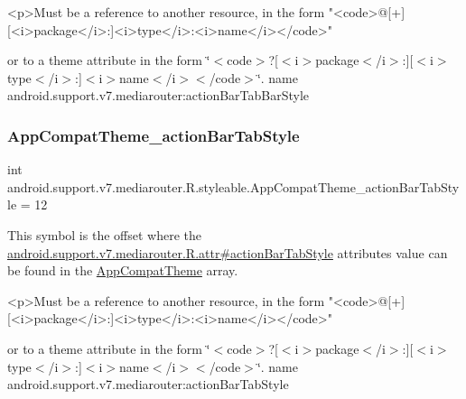 \begin{DoxyVerb}      <p>Must be a reference to another resource, in the form "<code>@[+][<i>package</i>:]<i>type</i>:<i>name</i></code>"
\end{DoxyVerb}
 or to a theme attribute in the form \char`\"{}$<$code$>$?\mbox{[}$<$i$>$package$<$/i$>$\+:\mbox{]}\mbox{[}$<$i$>$type$<$/i$>$\+:\mbox{]}$<$i$>$name$<$/i$>$$<$/code$>$\char`\"{}.  name android.\+support.\+v7.\+mediarouter\+:action\+Bar\+Tab\+Bar\+Style \mbox{\label{classandroid_1_1support_1_1v7_1_1mediarouter_1_1R_1_1styleable_a05c688cad9d1778c9c006d3567c37651}} 
\subsubsection{\texorpdfstring{App\+Compat\+Theme\+\_\+action\+Bar\+Tab\+Style}{AppCompatTheme\_actionBarTabStyle}}
{\footnotesize\ttfamily int android.\+support.\+v7.\+mediarouter.\+R.\+styleable.\+App\+Compat\+Theme\+\_\+action\+Bar\+Tab\+Style = 12\hspace{0.3cm}{\ttfamily [static]}}

This symbol is the offset where the \hyperlink{classandroid_1_1support_1_1v7_1_1mediarouter_1_1R_1_1attr_a092c66e5f0954d506b706e77e70ed366}{android.\+support.\+v7.\+mediarouter.\+R.\+attr\#action\+Bar\+Tab\+Style} attribute\textquotesingle{}s value can be found in the \hyperlink{classandroid_1_1support_1_1v7_1_1mediarouter_1_1R_1_1styleable_a4e3d3900c75d49aeb2f283cac00214d6}{App\+Compat\+Theme} array.

\begin{DoxyVerb}      <p>Must be a reference to another resource, in the form "<code>@[+][<i>package</i>:]<i>type</i>:<i>name</i></code>"
\end{DoxyVerb}
 or to a theme attribute in the form \char`\"{}$<$code$>$?\mbox{[}$<$i$>$package$<$/i$>$\+:\mbox{]}\mbox{[}$<$i$>$type$<$/i$>$\+:\mbox{]}$<$i$>$name$<$/i$>$$<$/code$>$\char`\"{}.  name android.\+support.\+v7.\+mediarouter\+:action\+Bar\+Tab\+Style \mbox{\label{classandroid_1_1support_1_1v7_1_1mediarouter_1_1R_1_1styleable_a943bcdaec9fb96bdbc26392220e88255}} 
